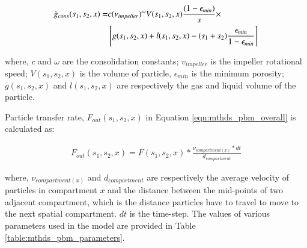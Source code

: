 \documentclass[preprint,11pt,authoryear]{elsarticle}
\begin{document}

\begin{align}
\dot{g}_{cons}(s_1,s_2,x)=&c(\nu_{impeller})^{\omega}V(s_1,s_2,x)\frac{(1-\epsilon_{min})}{s}\times \notag \\ 
& \left[g(s_1,s_2,x)+l(s_1,s_2,x) -(s_1+s_2)\frac{\epsilon_{min}}{1-\epsilon_{min}}\right]
\end{align}        

\par where, $c$ and $\omega$ are the consolidation constants; $v_{impeller}$ is the impeller rotational speed; $V(s_1,s_2,x)$ is the volume of particle, $\epsilon_{min}$ is the minimum porosity; $g(s_1,s_2,x)$ and $l(s_1,s_2,x)$ are respectively the gas and liquid volume of the particle.

\par Particle transfer rate, $F_{out}(s_1,s_2,x)$ in Equation \ref{eqn:mthds_pbm_overall} is calculated as:

\begin{align}
F_{out}(s_1,s_2,x) = F(s_1,s_2,x)*\frac{\nu_{compartment(x)}*dt}{d_{compartment}}
\end{align}

where, $\nu_{compartment(x)}$ and $d_{compartment}$ are respectively the average velocity of particles in compartment $x$ and the distance between the mid-points of two adjacent compartment, which is the distance particles have to travel to move to the next spatial compartment. $dt$ is the time-step.
The values of various parameters used in the model are provided in Table \ref{table:mthds_pbm_parameters}.
\end{document}
